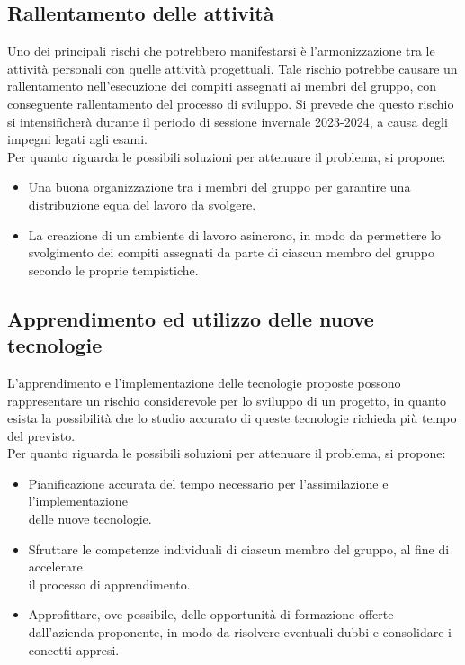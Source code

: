 \documentclass{article}
\begin{document}
\subsection{Rallentamento delle attività}
Uno dei principali rischi che potrebbero manifestarsi è l'armonizzazione tra le attività personali con quelle attività progettuali. Tale rischio
potrebbe causare un rallentamento nell'esecuzione dei compiti assegnati ai membri del gruppo, con conseguente rallentamento del processo di sviluppo. 
Si prevede che questo rischio si intensificherà durante il periodo di sessione invernale 2023-2024, a causa degli impegni legati agli esami.\\ 
Per quanto riguarda le possibili soluzioni per attenuare il problema, si propone: 
\begin{itemize}
    \item Una buona organizzazione tra i membri del gruppo per garantire una distribuzione equa del lavoro da svolgere.
    \item La creazione di un ambiente di lavoro asincrono, in modo da permettere lo svolgimento dei compiti assegnati da parte di ciascun membro del gruppo secondo le proprie tempistiche.
\end{itemize}

\subsection{Apprendimento ed utilizzo delle nuove tecnologie}
L’apprendimento e l'implementazione delle tecnologie proposte possono rappresentare un rischio considerevole per lo 
sviluppo di un progetto, in quanto esista la possibilità che lo studio accurato di queste tecnologie richieda più tempo del previsto. \\
Per quanto riguarda le possibili soluzioni per attenuare il problema, si propone:
\begin{itemize}
    \item Pianificazione accurata del tempo necessario per l’assimilazione e l’implementazione \\delle nuove tecnologie.
    \item Sfruttare le competenze individuali di ciascun membro del gruppo, al fine di accelerare \\ il processo di apprendimento.
    \item Approfittare, ove possibile, delle opportunità di formazione offerte dall’azienda proponente, in modo da risolvere eventuali dubbi e consolidare i concetti appresi.
\end{itemize}
\end{document}
